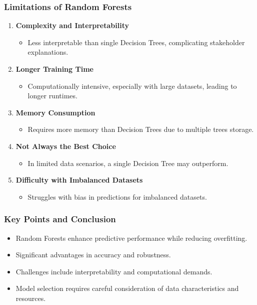 \documentclass[aspectratio=169]{beamer}
\begin{document}
\begin{frame}[fragile]
    \frametitle{Limitations of Random Forests}
    \begin{enumerate}
        \item \textbf{Complexity and Interpretability}
            \begin{itemize}
                \item Less interpretable than single Decision Trees, complicating stakeholder explanations.
            \end{itemize}
        \item \textbf{Longer Training Time}
            \begin{itemize}
                \item Computationally intensive, especially with large datasets, leading to longer runtimes.
            \end{itemize}
        \item \textbf{Memory Consumption}
            \begin{itemize}
                \item Requires more memory than Decision Trees due to multiple trees storage.
            \end{itemize}
        \item \textbf{Not Always the Best Choice}
            \begin{itemize}
                \item In limited data scenarios, a single Decision Tree may outperform.
            \end{itemize}
        \item \textbf{Difficulty with Imbalanced Datasets}
            \begin{itemize}
                \item Struggles with bias in predictions for imbalanced datasets.
            \end{itemize}
    \end{enumerate}
\end{frame}

\begin{frame}[fragile]
    \frametitle{Key Points and Conclusion}
    \begin{itemize}
        \item Random Forests enhance predictive performance while reducing overfitting.
        \item Significant advantages in accuracy and robustness.
        \item Challenges include interpretability and computational demands.
        \item Model selection requires careful consideration of data characteristics and resources.
    \end{itemize}
\end{frame}
\end{document}
